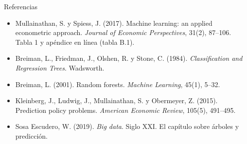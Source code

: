 \documentclass{beamer}
\begin{document}
\begin{frame}{Referencias}
\small
\begin{itemize}\itemsep4pt
  \item Mullainathan, S. y Spiess, J. (2017). Machine learning: an applied econometric approach. \emph{Journal of Economic Perspectives}, 31(2), 87--106. Tabla 1 y apéndice en línea (tabla B.1).
  \item Breiman, L., Friedman, J., Olshen, R. y Stone, C. (1984). \emph{Classification and Regression Trees}. Wadsworth.
  \item Breiman, L. (2001). Random forests. \emph{Machine Learning}, 45(1), 5--32.
  \item Kleinberg, J., Ludwig, J., Mullainathan, S. y Obermeyer, Z. (2015). Prediction policy problems. \emph{American Economic Review}, 105(5), 491--495.
  \item Sosa Escudero, W. (2019). \emph{Big data}. Siglo XXI. El capítulo sobre árboles y predicción.
\end{itemize}
\end{frame}
\end{document}
